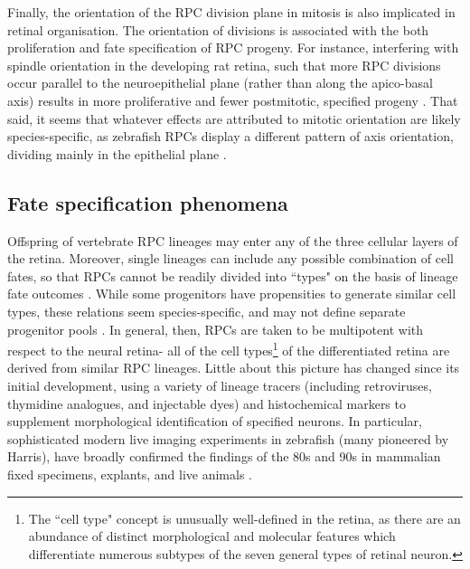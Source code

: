 Finally, the orientation of the RPC division plane in mitosis is also  implicated in retinal organisation. The orientation of divisions is associated with the both proliferation and fate specification of RPC progeny. For instance, interfering with spindle orientation in the developing rat retina, such that more RPC divisions occur parallel to the neuroepithelial plane (rather than along the apico-basal axis) results in more proliferative and fewer postmitotic, specified progeny \cite{Zigman2005}. That said, it seems that whatever effects are attributed to mitotic orientation are likely species-specific, as zebrafish RPCs display a different pattern of axis orientation, dividing mainly in the epithelial plane \cite{Das2003}.

\subsection{Fate specification phenomena}

Offspring of vertebrate RPC lineages may enter any of the three cellular layers of the retina. Moreover, single lineages can include any possible combination of cell fates, so that RPCs cannot be readily divided into ``types" on the basis of lineage fate outcomes \cite{Holt1988,Turner1990,Wetts1988}. While some progenitors have propensities to generate similar cell types, these relations seem species-specific, and may not define separate progenitor pools \cite{Adler2008}. In general, then, RPCs are taken to be multipotent with respect to the neural retina- all of the cell types\footnote{The ``cell type" concept is unusually well-defined in the retina, as there are an abundance of distinct morphological and molecular features which differentiate numerous subtypes of the seven general types of retinal neuron.} of the differentiated retina are derived from similar RPC lineages. Little about this picture has changed since its initial development, using a variety of lineage tracers (including retroviruses, thymidine analogues, and injectable dyes) and histochemical markers to supplement morphological identification of specified neurons. In particular, sophisticated modern live imaging experiments in zebrafish (many pioneered by Harris), have broadly confirmed the findings of the 80s and 90s in mammalian fixed specimens, explants, and live animals \cite{Boije2015}.

